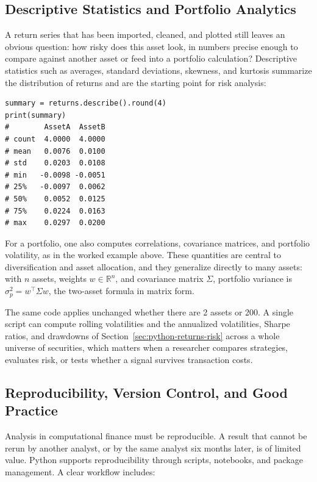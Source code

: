 \documentclass[../ai_in_finance]{subfiles}
\begin{document}
\subsection{Descriptive Statistics and Portfolio Analytics}
\label{sec:python-descriptive-stats}

A return series that has been imported, cleaned, and plotted still leaves an obvious question: how risky does this asset look, in numbers precise enough to compare against another asset or feed into a portfolio calculation? Descriptive statistics such as averages, standard deviations, skewness, and kurtosis summarize the distribution of returns and are the starting point for risk analysis:

\begin{verbatim}
summary = returns.describe().round(4)
print(summary)
#        AssetA  AssetB
# count  4.0000  4.0000
# mean   0.0076  0.0100
# std    0.0203  0.0108
# min   -0.0098 -0.0051
# 25%   -0.0097  0.0062
# 50%    0.0052  0.0125
# 75%    0.0224  0.0163
# max    0.0297  0.0200
\end{verbatim}

For a portfolio, one also computes correlations, covariance matrices, and portfolio volatility, as in the worked example above. These quantities are central to diversification and asset allocation, and they generalize directly to many assets: with $n$ assets, weights $w \in \mathbb{R}^n$, and covariance matrix $\Sigma$, portfolio variance is $\sigma_p^2 = w^\top \Sigma w$, the two-asset formula in matrix form.

The same code applies unchanged whether there are 2 assets or 200. A single script can compute rolling volatilities and the annualized volatilities, Sharpe ratios, and drawdowns of Section~\ref{sec:python-returns-risk} across a whole universe of securities, which matters when a researcher compares strategies, evaluates risk, or tests whether a signal survives transaction costs.

\subsection{Reproducibility, Version Control, and Good Practice}

Analysis in computational finance must be reproducible. A result that cannot be rerun by another analyst, or by the same analyst six months later, is of limited value. Python supports reproducibility through scripts, notebooks, and package management. A clear workflow includes:
\end{document}

